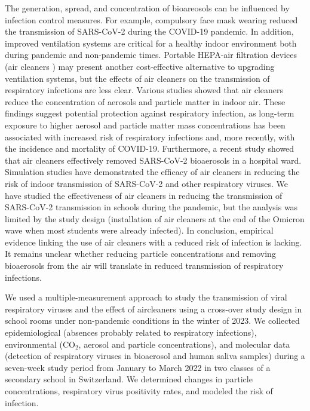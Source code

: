 \documentclass[fleqn,11pt]{wlscirep}
\begin{document}
The generation, spread, and concentration of bioareosols can be influenced by infection control measures. For example, compulsory face mask wearing reduced the transmission of SARS-CoV-2 during the COVID-19 pandemic\cite{Gettings2021,Heinsohn2022,Leech2022PNAS,Mitze2020PNAS,Banholzer2021PLOS}. In addition, improved ventilation systems are critical for a healthy indoor environment both during pandemic and non-pandemic times\cite{Wang2021,Morawska2021}. Portable HEPA-air filtration devices (air cleaners ) may present another cost-effective alternative to upgrading ventilation systems, but the effects of air cleaners on the transmission of respiratory infections are less clear. Various studies showed that air cleaners reduce the concentration of aerosols and particle matter in indoor air\cite{Park2020Build,Buising2022InfContr,Ren2021Dent,Banholzer2023PLoSMed}. These findings suggest potential protection against respiratory infection, as long-term exposure to higher aerosol and particle matter mass concentrations has been associated with increased risk of respiratory infections\cite{Gordon2014Resp} and, more recently, with the incidence and mortality of COVID-19\cite{Kelly2023Atmos,Veronesi2022OccEnvMed,Travaglio2021EnvPoll,DeAngelis2021EnvRes}. Furthermore, a recent study showed that air cleaners effectively removed SARS-CoV-2 bioaerosols in a hospital ward\cite{Morris2022}. Simulation studies have demonstrated the efficacy of air cleaners in reducing the risk of indoor transmission  of SARS-CoV-2\cite{Lindsley2021} and other respiratory viruses\cite{Cortellessa2023Build}.  We have studied the effectiveness of air cleaners in reducing the transmission of SARS-CoV-2 transmission in schools during the pandemic\cite{Banholzer2023PLoSMed}, but the analysis was limited by the study design (installation of air cleaners at the end of the Omicron wave when most students were already infected). In conclusion, empirical evidence linking the use of air cleaners with a reduced risk of infection is lacking. It remains unclear whether reducing particle concentrations and removing bioaerosols from the air will translate in reduced transmission of respiratory infections. 

We used a multiple-measurement approach to study the transmission of viral respiratory viruses and the effect of aircleaners using a cross-over study design in school rooms under non-pandemic conditions in the winter of 2023. We collected epidemiological (absences probably related to respiratory infections), environmental (CO$_2$, aerosol and particle concentrations), and molecular data (detection of respiratory viruses in bioaerosol and human saliva samples) during a seven-week study period from January to March 2022 in two classes of a secondary school in Switzerland. We determined changes in particle concentrations, respiratory virus positivity rates, and modeled the risk of infection.
\end{document}
